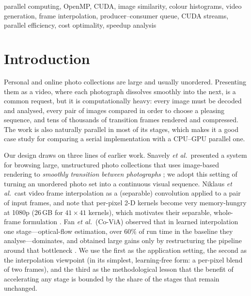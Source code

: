 \documentclass[conference]{IEEEtran}
\begin{document}
\begin{IEEEkeywords}
parallel computing, OpenMP, CUDA, image similarity, colour histograms, video generation, frame interpolation, producer--consumer queue, CUDA streams, parallel efficiency, cost optimality, speedup analysis
\end{IEEEkeywords}

\section{Introduction}
Personal and online photo collections are large and usually unordered. Presenting them as a video, where each photograph dissolves smoothly into the next, is a common request, but it is computationally heavy: every image must be decoded and analysed, every pair of images compared in order to choose a pleasing sequence, and tens of thousands of transition frames rendered and compressed. The work is also naturally parallel in most of its stages, which makes it a good case study for comparing a serial implementation with a CPU--GPU parallel one.

Our design draws on three lines of earlier work. Snavely \emph{et al.}\ presented a system for browsing large, unstructured photo collections that uses image-based rendering to \emph{smoothly transition between photographs} \cite{snavely2006}; we adopt this setting of turning an unordered photo set into a continuous visual sequence. Niklaus \emph{et al.}\ cast video frame interpolation as a (separable) convolution applied to a pair of input frames, and note that per-pixel 2-D kernels become very memory-hungry at 1080p (26\,GB for $41\times41$ kernels), which motivates their separable, whole-frame formulation \cite{niklaus2017}. Fan \emph{et al.}\ (Co-ViA) observed that in learned interpolation one stage---optical-flow estimation, over $60\%$ of run time in the baseline they analyse---dominates, and obtained large gains only by restructuring the pipeline around that bottleneck \cite{fan2024}. We use the first as the application setting, the second as the interpolation viewpoint (in its simplest, learning-free form: a per-pixel blend of two frames), and the third as the methodological lesson that the benefit of accelerating any stage is bounded by the share of the stages that remain unchanged.
\end{document}
